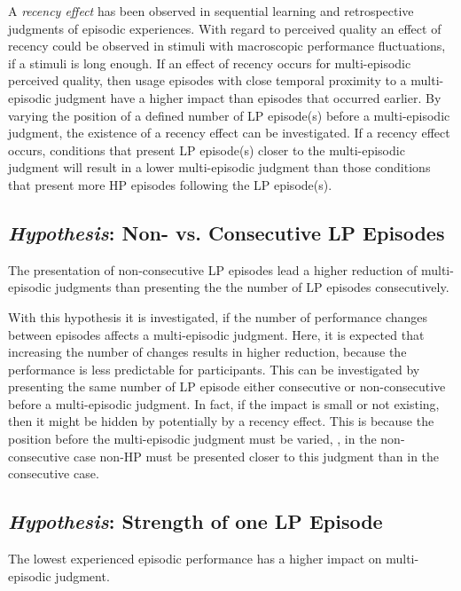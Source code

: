 A \emph{recency effect} has been observed in sequential learning and retrospective judgments of episodic experiences.
With regard to perceived quality an effect of recency could be observed in stimuli with macroscopic performance fluctuations, if a stimuli is long enough.
If an effect of recency occurs for multi-episodic perceived quality, then usage episodes with close temporal proximity to a multi-episodic judgment have a higher impact than episodes that occurred earlier.
By varying the position of a defined number of \ac{LP} episode(s) before a multi-episodic judgment, the existence of a recency effect can be investigated.
If a recency effect occurs, conditions that present \ac{LP} episode(s) closer to the multi-episodic judgment will result in a lower multi-episodic judgment than those conditions that present more \ac{HP} episodes following the \ac{LP} episode(s).

\subsection{\emph{Hypothesis}: Non- vs. Consecutive \acs{LP} Episodes}
\begin{hypothesis}\label{hypo:consecutive}
The presentation of non-consecutive \ac{LP} episodes lead a higher reduction of multi-episodic judgments than presenting the the number of \ac{LP} episodes consecutively.
\end{hypothesis}

With this hypothesis it is investigated, if the number of performance changes between episodes affects a multi-episodic judgment.
Here, it is expected that increasing the number of changes results in higher reduction, because the performance is less predictable for participants.
This can be investigated by presenting the same number of \ac{LP} episode either consecutive or non-consecutive before a multi-episodic judgment.
In fact, if the impact is small or not existing, then it might be hidden by potentially by a recency effect.
This is because the position before the multi-episodic judgment must be varied, \ie, in the non-consecutive case non-\ac{HP} must be presented closer to this judgment than in the consecutive case.

\subsection{\emph{Hypothesis}: Strength of one \acs{LP} Episode}
\begin{hypothesis}\label{hypo:strength}
The lowest experienced episodic performance has a higher impact on multi-episodic judgment.
\end{hypothesis}

